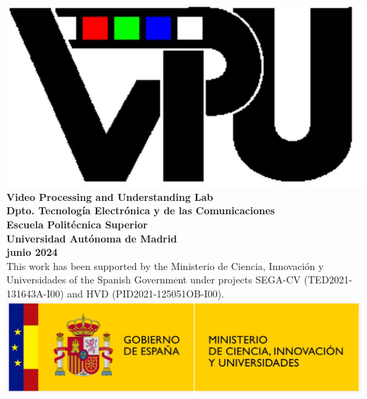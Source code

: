
\newpage
\thispagestyle{firstpage}

\vspace*{3cm} 
\begin{center}
    \includegraphics[clip,scale=0.25]{logoVPU.jpeg} \\ \textbf{Video Processing and Understanding Lab}\\
    \textbf{Dpto. Tecnología Electrónica y de las Comunicaciones}\\
    \textbf{Escuela Politécnica Superior}\\
    \textbf{Universidad Autónoma de Madrid }\\
    \textbf{junio 2024}\\
    \vspace*{3cm} 
    This work has been supported by the Ministerio de Ciencia, Innovación y Universidades of the Spanish Government under projects SEGA-CV (TED2021-131643A-I00) and HVD (PID2021-125051OB-I00). \\ 
    \vspace*{1cm} 
    \includegraphics[clip,scale=0.25]{logoMinisterio.jpeg} 
\end{center}
